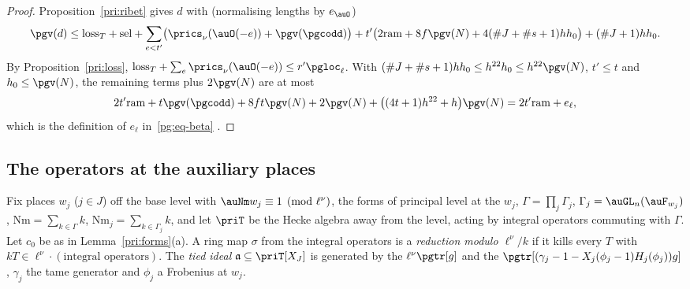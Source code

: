 \documentclass[10pt]{amsart}
\theoremstyle{definition}
\theoremstyle{remark}
\begin{document}
\begin{proof}
Proposition~\ref{pri:ribet} gives $d$ with (normalising lengths by $e_\auO$)
\[
\pgv(d)\le\mathrm{loss}_T+\mathrm{sel}+\sum_{e<t'}\bigl(\prics_\nu(\auO(-e))+\pgv(\pgcodd)\bigr)+
t'\bigl(2\mathrm{ram}+8f\pgv(N)+4(\#J+\#s+1)hh_0\bigr)+(\#J+1)hh_0 .
\]
By Proposition~\ref{pri:loss}, $\mathrm{loss}_T+\sum_e\prics_\nu(\auO(-e))\le r'\pgloc_\ell$. With
$(\#J+\#s+1)hh_0\le h^{22}h_0\le h^{22}\pgv(N)$, $t'\le t$ and $h_0\le\pgv(N)$, the remaining terms plus
$2\pgv(N)$ are at most
\[
2t'\mathrm{ram}+t\pgv(\pgcodd)+8ft\pgv(N)+2\pgv(N)+\bigl((4t+1)h^{22}+h\bigr)\pgv(N)=2t'\mathrm{ram}+e_\ell,
\]
which is the definition of $e_\ell$ in~\eqref{pg:eq-beta} .
\end{proof}

\subsection{The operators at the auxiliary places}\label{pri:ss-norm}

Fix places $w_j$ ($j\in J$) off the base level with $\auNm w_j\equiv1\pmod{\ell^\nu}$, the forms of
principal level at the $w_j$, $\Gamma=\prod_j\Gamma_j$, $\Gamma_j=\auGL_n(\auF_{w_j})$,
$\mathrm{Nm}=\sum_{k\in\Gamma}k$, $\mathrm{Nm}_j=\sum_{k\in\Gamma_j}k$, and let $\priT$ be the Hecke
algebra away from the level, acting by integral operators commuting with $\Gamma$. Let $c_0$ be as
in Lemma~\ref{pri:forms}(a). A ring map $\sigma$ from the integral operators is a \emph{reduction
modulo $\ell^\nu/k$} if it kills every $T$ with $kT\in\ell^\nu\cdot(\text{integral operators})$. The
\emph{tied ideal} $\mathfrak a\subseteq\priT[X_J]$ is generated by the $\ell^\nu\pgtr[g]$ and the
$\pgtr[(\gamma_j-1-X_j(\phi_j-1)H_j(\phi_j))g]$, $\gamma_j$ the tame generator and $\phi_j$ a
Frobenius at $w_j$.
\end{document}
